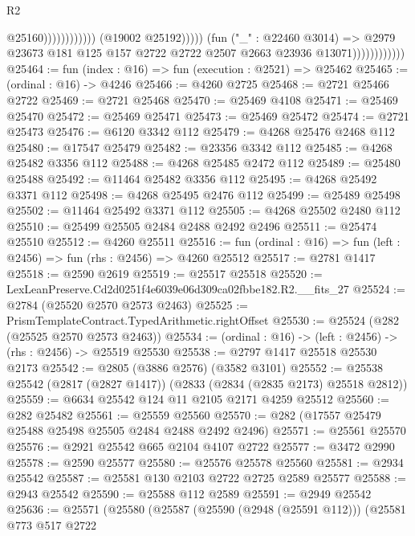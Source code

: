 \begin{lexlean}{R2}
\begin{coremodule}
                                                          @25160))))))))))))
                                  (@19002 @25192)))))
                          (fun ("_" : @22460 @3014) =>
                          @2979
                            @23673
                            @181
                            @125
                            @157
                            @2722
                            @2722
                            @2507
                            @2663
                            @23936
                            @13071))))))))))))
@25464 := fun (index : @16) => fun (execution : @2521) => @25462
@25465 := (ordinal : @16) -> @4246
@25466 := @4260 @2725
@25468 := @2721 @25466 @2722
@25469 := @2721 @25468
@25470 := @25469 @4108
@25471 := @25469 @25470
@25472 := @25469 @25471
@25473 := @25469 @25472
@25474 := @2721 @25473
@25476 := @6120 @3342 @112
@25479 := @4268 @25476 @2468 @112
@25480 := @17547 @25479
@25482 := @23356 @3342 @112
@25485 := @4268 @25482 @3356 @112
@25488 := @4268 @25485 @2472 @112
@25489 := @25480 @25488
@25492 := @11464 @25482 @3356 @112
@25495 := @4268 @25492 @3371 @112
@25498 := @4268 @25495 @2476 @112
@25499 := @25489 @25498
@25502 := @11464 @25492 @3371 @112
@25505 := @4268 @25502 @2480 @112
@25510 := @25499 @25505 @2484 @2488 @2492 @2496
@25511 := @25474 @25510
@25512 := @4260 @25511
@25516 := fun (ordinal : @16) => fun (left : @2456) => fun (rhs : @2456) => @4260 @25512
@25517 := @2781 @1417
@25518 := @2590 @2619
@25519 := @25517 @25518
@25520 := LexLeanPreserve.Cd2d0251f4e6039e06d309ca02fbbe182.R2.__fits_27
@25524 := @2784 (@25520 @2570 @2573 @2463)
@25525 := PrismTemplateContract.TypedArithmetic.rightOffset
@25530 := @25524 (@282 (@25525 @2570 @2573 @2463))
@25534 := (ordinal : @16) -> (left : @2456) -> (rhs : @2456) -> @25519 @25530
@25538 := @2797 @1417 @25518 @25530 @2173
@25542 := @2805 (@3886 @2576) (@3582 @3101)
@25552 := @25538 @25542 (@2817 (@2827 @1417)) (@2833 (@2834 (@2835 @2173) @25518 @2812))
@25559 := @6634 @25542 @124 @11 @2105 @2171 @4259 @25512
@25560 := @282 @25482
@25561 := @25559 @25560
@25570 := @282 (@17557 @25479 @25488 @25498 @25505 @2484 @2488 @2492 @2496)
@25571 := @25561 @25570
@25576 := @2921 @25542 @665 @2104 @4107 @2722
@25577 := @3472 @2990
@25578 := @2590 @25577
@25580 := @25576 @25578 @25560
@25581 := @2934 @25542
@25587 := @25581 @130 @2103 @2722 @2725 @2589 @25577
@25588 := @2943 @25542
@25590 := @25588 @112 @2589
@25591 := @2949 @25542
@25636 := @25571
    (@25580
      (@25587
        (@25590 (@2948 (@25591 @112)))
        (@25581
          @773
          @517
          @2722

\end{coremodule}
\end{lexlean}
